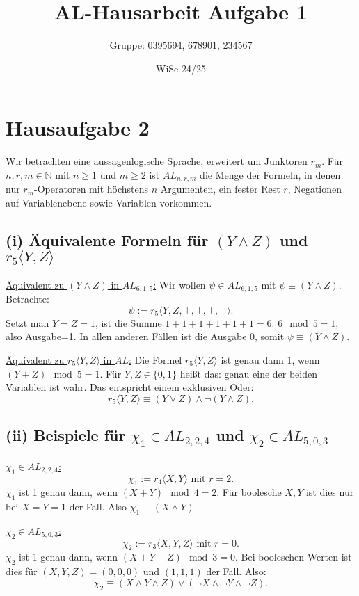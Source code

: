 \documentclass[12pt,a4paper]{article}
\title{AL-Hausarbeit Aufgabe 1}
\author{Gruppe: 0395694, 678901, 234567}
\date{WiSe 24/25}
\begin{document}
\maketitle

\section*{Hausaufgabe 2}

Wir betrachten eine aussagenlogische Sprache, erweitert um Junktoren $r_m$. Für $n,r,m \in \mathbb{N}$ mit $n \ge 1$ und $m \ge 2$ ist $AL_{n,r,m}$ die Menge der Formeln, in denen nur $r_m$-Operatoren mit höchstens $n$ Argumenten, ein fester Rest $r$, Negationen auf Variablenebene sowie Variablen vorkommen.

\subsection*{(i) Äquivalente Formeln für $(Y \land Z)$ und $r_5 \langle Y, Z \rangle$}

\underline{Äquivalent zu $(Y \land Z)$ in $AL_{6,1,5}$:}  
Wir wollen $\psi \in AL_{6,1,5}$ mit $\psi \equiv (Y \land Z)$.  
Betrachte:
\[
\psi := r_5\langle Y, Z, \top, \top, \top, \top \rangle.
\]
Setzt man $Y=Z=1$, ist die Summe $1+1+1+1+1+1=6$. $6 \mod 5=1$, also Ausgabe=1. In allen anderen Fällen ist die Ausgabe 0, somit $\psi \equiv (Y \land Z)$.

\underline{Äquivalent zu $r_5\langle Y,Z \rangle$ in $AL$:}  
Die Formel $r_5\langle Y,Z \rangle$ ist genau dann 1, wenn $(Y+Z)\mod 5=1$. Für $Y,Z \in \{0,1\}$ heißt das: genau eine der beiden Variablen ist wahr. Das entspricht einem exklusiven Oder:
\[
r_5\langle Y,Z\rangle \equiv (Y \lor Z) \land \neg(Y \land Z).
\]

\subsection*{(ii) Beispiele für $\chi_1 \in AL_{2,2,4}$ und $\chi_2 \in AL_{5,0,3}$}

\underline{$\chi_1 \in AL_{2,2,4}$:}  
\[
\chi_1 := r_4\langle X,Y \rangle \text{ mit } r=2.
\]
$\chi_1$ ist 1 genau dann, wenn $(X+Y) \mod4=2$. Für boolesche $X,Y$ ist dies nur bei $X=Y=1$ der Fall.  
Also $\chi_1 \equiv (X \land Y)$.

\underline{$\chi_2 \in AL_{5,0,3}$:}  
\[
\chi_2 := r_3\langle X,Y,Z \rangle \text{ mit } r=0.
\]
$\chi_2$ ist 1 genau dann, wenn $(X+Y+Z)\mod 3=0$. Bei booleschen Werten ist dies für $(X,Y,Z)=(0,0,0)$ und $(1,1,1)$ der Fall. Also:
\[
\chi_2 \equiv (X \land Y \land Z) \lor (\neg X \land \neg Y \land \neg Z).
\]
\end{document}
